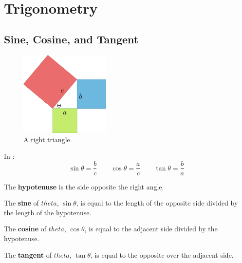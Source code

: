 \chapter{Trigonometry}

\section{Sine, Cosine, and Tangent}
\begin{figure}[H]
  \begin{center}
    \includegraphics[width=0.4\textwidth]{continuous/trig/basictrig}
  \end{center}
  \caption{A right triangle.}
  \label{fig:right_triangle}
\end{figure}

In :
  \[\displaystyle{\sin\theta=\frac{b}{c}}\qquad
  \displaystyle{\cos\theta=\frac{a}{c}}\qquad
  \displaystyle{\tan\theta=\frac{b}{a}}\]

\begin{defn}
    The \textbf{hypotenuse} is the side opposite the right angle.
\end{defn}
\begin{defn}
    The \textbf{sine} of $theta$, $\sin\theta$, is equal to the length of the opposite side divided by the length of the hypotenuse.
\end{defn}
\begin{defn}
    The \textbf{cosine} of $theta$, $\cos\theta$, is equal to the adjacent side divided by the hypotenuse.
\end{defn}
\begin{defn}
    The \textbf{tangent} of $theta$, $\tan\theta$, is equal to the opposite over the adjacent side.
\end{defn}

